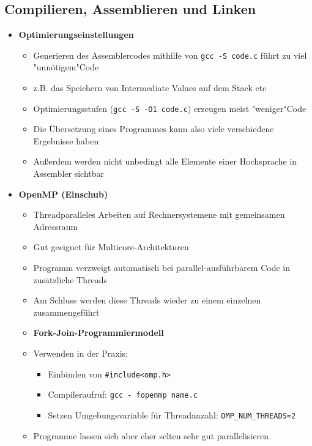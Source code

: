 \subsection{Compilieren, Assemblieren und Linken}
    \begin{itemize}
        \item \textbf{Optimierungseinstellungen}
            \begin{itemize}
                \item Generieren des Assemblercodes mithilfe von \texttt{gcc -S code.c} führt zu viel \string"unnötigem"\string Code
                \item z.B. das Speichern von Intermediate Values auf dem Stack etc
                \item Optimierungsstufen (\texttt{gcc -S -O1 code.c}) erzeugen meist \string"weniger"\string Code
                \item Die Übersetzung eines Programmes kann also viele verschiedene Ergebnisse haben
                \item Außerdem werden nicht unbedingt alle Elemente einer Hochsprache in Assembler sichtbar
            \end{itemize}

        \item \textbf{OpenMP (Einschub)}
            \begin{itemize}
                \item Threadparalleles Arbeiten auf Rechnersystemene mit gemeinsamen Adressraum
                \item Gut geeignet für Multicore-Architekturen
                \item Programm verzweigt automatisch bei parallel-ausführbarem Code in zusätzliche Threads
                \item Am Schluss werden diese Threads wieder zu einem einzelnen zusammengeführt
                \item \textbf{Fork-Join-Programmiermodell}
                \item Verwenden in der Praxis:
                    \begin{itemize}
                        \item Einbinden von \texttt{\#include<omp.h>}
                        \item Compileraufruf: \texttt{gcc - fopenmp name.c}
                        \item Setzen Umgebungsvariable für Threadanzahl: \texttt{OMP\_NUM\_THREADS=2}
                    \end{itemize}
                \item Programme lassen sich aber eher selten sehr gut parallelisieren
            \end{itemize}


\end{itemize}
